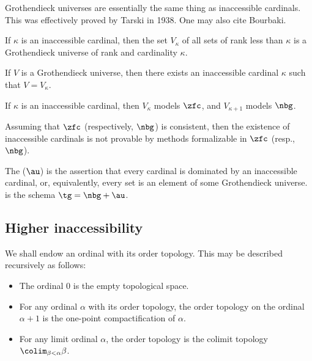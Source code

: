 Grothendieck universes are essentially the same thing as inaccessible cardinals.
This was effectively proved by Tarski in 1938.
One may also cite Bourbaki.\citep[Exposé I, Appendix]{SGA41}
\begin{proposition}
	If $\kappa$ is an inaccessible cardinal, then
	the set $V_{\kappa}$ of all sets of rank less than $\kappa$ is
	a Grothendieck universe of rank and cardinality $\kappa$.

	If $ V $ is a Grothendieck universe, then
	there exists an inaccessible cardinal $ \kappa $ such that $ V=V_{\kappa} $.
\end{proposition}

\begin{theorem}
	If $ \kappa $ is an inaccessible cardinal,
	then $V_{\kappa} $ models $ \zfc $, and
	$ V_{\kappa+1} $ models $ \nbg $.
	
	Assuming that $ \zfc $ (respectively, $ \nbg $) is consistent, then
	the existence of inaccessible cardinals is not provable
	by methods formalizable in $ \zfc $ (resp., $ \nbg $).
\end{theorem}

\begin{axiom}%
\label{axm:AU}
	The  ($ \au $) is the assertion that
	every cardinal is dominated by an inaccessible cardinal,
	or, equivalently, every set is an element of some Grothendieck universe.
	 is the schema $\tg = \nbg+\au$.
\end{axiom}

\subsection{Higher inaccessibility}%
\label{sub:higher_inaccessibility}

\begin{nul}
	We shall endow an ordinal with its order topology.
	This may be described recursively as follows:
	\begin{itemize}
		\item The ordinal $ 0 $ is the empty topological space.
		\item For any ordinal $ \alpha $ with its order topology,
			the order topology on the ordinal $ \alpha + 1 $
			is the one-point compactification of $ \alpha $.
		\item For any limit ordinal $ \alpha $,
			the order topology is the colimit topology
			$ \colim_{\beta < \alpha} \beta $.
	\end{itemize}
\end{nul}

